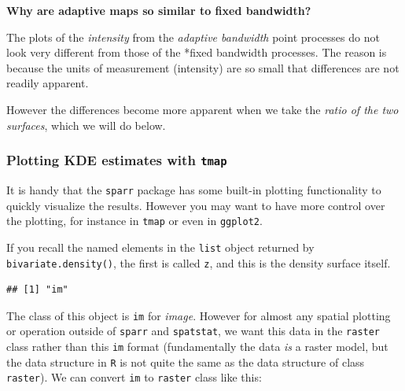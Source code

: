 \documentclass[
]{book}
\newenvironment{Shaded}{\begin{snugshade}}{\end{snugshade}}
\newcommand{\FunctionTok}[1]{\textcolor[rgb]{0.00,0.00,0.00}{#1}}
\newcommand{\NormalTok}[1]{#1}
\newcommand{\SpecialCharTok}[1]{\textcolor[rgb]{0.00,0.00,0.00}{#1}}
\newenvironment{rmdnote}[1]
  {
  \begin{itemize}
  \renewcommand{\labelitemi}{
    \raisebox{-.7\height}[0pt][0pt]{
      {\setkeys{Gin}{width=3em,keepaspectratio}\texttt{[image: images/\#1]}}
    }
  }
  \setlength{\fboxsep}{1em}
  \begin{note}
  \item
  }
  {
  \end{note}
  \end{itemize}
  }
\begin{document}
\begin{rmdnote}{note}
\textbf{Why are adaptive maps so similar to fixed bandwidth?}

The plots of the \emph{intensity} from the \emph{adaptive bandwidth} point processes do not look very different from those of the *fixed bandwidth processes. The reason is because the units of measurement (intensity) are so small that differences are not readily apparent.

However the differences become more apparent when we take the \emph{ratio of the two surfaces}, which we will do below.

\end{rmdnote}

\hypertarget{plotting-kde-estimates-with-tmap}{%
\subsubsection{\texorpdfstring{Plotting KDE estimates with \texttt{tmap}}{Plotting KDE estimates with tmap}}\label{plotting-kde-estimates-with-tmap}}

It is handy that the \texttt{sparr} package has some built-in plotting functionality to quickly visualize the results. However you may want to have more control over the plotting, for instance in \texttt{tmap} or even in \texttt{ggplot2}.

If you recall the named elements in the \texttt{list} object returned by \texttt{bivariate.density()}, the first is called \texttt{z}, and this is the density surface itself.

\begin{Shaded}
\end{Shaded}

\begin{verbatim}
## [1] "im"
\end{verbatim}

The class of this object is \texttt{im} for \emph{image}. However for almost any spatial plotting or operation outside of \texttt{sparr} and \texttt{spatstat}, we want this data in the \texttt{raster} class rather than this \texttt{im} format (fundamentally the data \emph{is} a raster model, but the data structure in \texttt{R} is not quite the same as the data structure of class \texttt{raster}). We can convert \texttt{im} to \texttt{raster} class like this:
\end{document}
